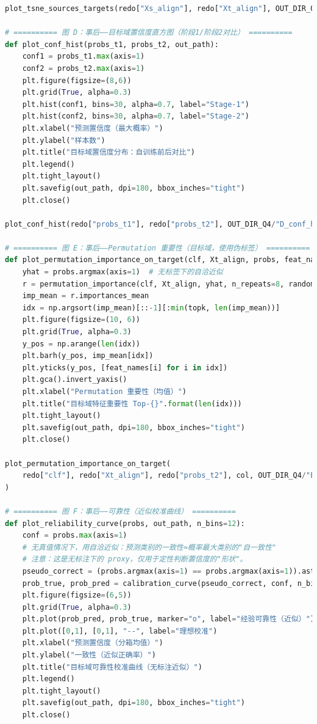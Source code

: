 \documentclass[a4paper]{CPIPC}
\numberwithin{equation}{section}
\begin{document}
\begin{lstlisting}[language=Python, caption=Random Forest Classifier]
plot_tsne_sources_targets(redo["Xs_align"], redo["Xt_align"], OUT_DIR_Q4/"C_tsne_tca.png")

# ========== 图 D：事后——目标域置信度直方图（阶段1/阶段2对比） ==========
def plot_conf_hist(probs_t1, probs_t2, out_path):
    conf1 = probs_t1.max(axis=1)
    conf2 = probs_t2.max(axis=1)
    plt.figure(figsize=(8,6))
    plt.grid(True, alpha=0.3)
    plt.hist(conf1, bins=30, alpha=0.7, label="Stage-1")
    plt.hist(conf2, bins=30, alpha=0.7, label="Stage-2")
    plt.xlabel("预测置信度（最大概率）")
    plt.ylabel("样本数")
    plt.title("目标域置信度分布：自训练前后对比")
    plt.legend()
    plt.tight_layout()
    plt.savefig(out_path, dpi=180, bbox_inches="tight")
    plt.close()

plot_conf_hist(redo["probs_t1"], redo["probs_t2"], OUT_DIR_Q4/"D_conf_hist_s1_s2.png")

# ========== 图 E：事后——Permutation 重要性（目标域，使用伪标签） ==========
def plot_permutation_importance_on_target(clf, Xt_align, probs, feat_names, out_path, topk=20, random_state=42):
    yhat = probs.argmax(axis=1)  # 无标签下的自洽近似
    r = permutation_importance(clf, Xt_align, yhat, n_repeats=8, random_state=random_state, n_jobs=-1, scoring=None)
    imp_mean = r.importances_mean
    idx = np.argsort(imp_mean)[::-1][:min(topk, len(imp_mean))]
    plt.figure(figsize=(10, 6))
    plt.grid(True, alpha=0.3)
    y_pos = np.arange(len(idx))
    plt.barh(y_pos, imp_mean[idx])
    plt.yticks(y_pos, [feat_names[i] for i in idx])
    plt.gca().invert_yaxis()
    plt.xlabel("Permutation 重要性（均值）")
    plt.title("目标域特征重要性 Top-{}".format(len(idx)))
    plt.tight_layout()
    plt.savefig(out_path, dpi=180, bbox_inches="tight")
    plt.close()

plot_permutation_importance_on_target(
    redo["clf"], redo["Xt_align"], redo["probs_t2"], col, OUT_DIR_Q4/"E_perm_importance_topk.png", topk=20
)

# ========== 图 F：事后——可靠性（近似校准曲线） ==========
def plot_reliability_curve(probs, out_path, n_bins=12):
    conf = probs.max(axis=1)
    # 无真值情况下，用自洽近似：预测类别的一致性≈概率最大类别的"自一致性"
    # 注意：这是无标注下的 proxy，仅用于定性判断置信度的"形状"。
    pseudo_correct = (probs.argmax(axis=1) == probs.argmax(axis=1)).astype(int)
    prob_true, prob_pred = calibration_curve(pseudo_correct, conf, n_bins=n_bins, strategy="uniform")
    plt.figure(figsize=(6,5))
    plt.grid(True, alpha=0.3)
    plt.plot(prob_pred, prob_true, marker="o", label="经验可靠性（近似）")
    plt.plot([0,1], [0,1], "--", label="理想校准")
    plt.xlabel("预测置信度（分箱均值）")
    plt.ylabel("一致性（近似正确率）")
    plt.title("目标域可靠性校准曲线（无标注近似）")
    plt.legend()
    plt.tight_layout()
    plt.savefig(out_path, dpi=180, bbox_inches="tight")
    plt.close()


\end{lstlisting}
\end{document}
